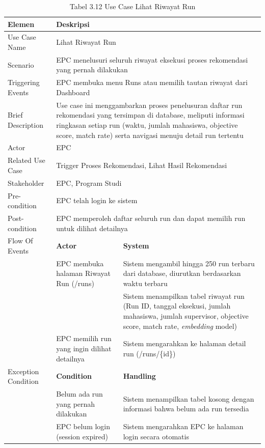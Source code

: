 \begin{longtable}{|p{3.5cm}|p{4.5cm}|p{5cm}|}
\caption{Tabel 3.12 Use Case Lihat Riwayat Run} \label{table:tab3.12} \\
\hline
\textbf{Elemen} & \multicolumn{2}{p{\ucdeskcol}|}{\textbf{Deskripsi}} \\
\hline
\endfirsthead
\endhead
\hline
\endfoot
Use Case Name & \multicolumn{2}{p{\ucdeskcol}|}{Lihat Riwayat Run} \\
\hline
Scenario & \multicolumn{2}{p{\ucdeskcol}|}{EPC menelusuri seluruh riwayat eksekusi proses rekomendasi yang pernah dilakukan} \\
\hline
Triggering Events & \multicolumn{2}{p{\ucdeskcol}|}{EPC membuka menu Runs atau memilih tautan riwayat dari Dashboard} \\
\hline
Brief Description & \multicolumn{2}{p{\ucdeskcol}|}{Use case ini menggambarkan proses penelusuran daftar run rekomendasi yang tersimpan di database, meliputi informasi ringkasan setiap run (waktu, jumlah mahasiswa, objective score, match rate) serta navigasi menuju detail run tertentu} \\
\hline
Actor & \multicolumn{2}{p{\ucdeskcol}|}{EPC} \\
\hline
Related Use Case & \multicolumn{2}{p{\ucdeskcol}|}{Trigger Proses Rekomendasi, Lihat Hasil Rekomendasi} \\
\hline
Stakeholder & \multicolumn{2}{p{\ucdeskcol}|}{EPC, Program Studi} \\
\hline
Pre-condition & \multicolumn{2}{p{\ucdeskcol}|}{EPC telah login ke sistem} \\
\hline
Post-condition & \multicolumn{2}{p{\ucdeskcol}|}{EPC memperoleh daftar seluruh run dan dapat memilih run untuk dilihat detailnya} \\
\hline
Flow Of Events & \textbf{Actor} & \textbf{System} \\
\hline
 & EPC membuka halaman Riwayat Run (/runs) & Sistem mengambil hingga 250 run terbaru dari database, diurutkan berdasarkan waktu terbaru \\
\hline
 & & Sistem menampilkan tabel riwayat run (Run ID, tanggal eksekusi, jumlah mahasiswa, jumlah supervisor, objective score, match rate, \textit{embedding} model) \\
\hline
 & EPC memilih run yang ingin dilihat detailnya & Sistem mengarahkan ke halaman detail run (/runs/\{id\}) \\
\hline
Exception Condition & \textbf{Condition} & \textbf{Handling} \\
\hline
 & Belum ada run yang pernah dilakukan & Sistem menampilkan tabel kosong dengan informasi bahwa belum ada run tersedia \\
\hline
 & EPC belum login (session expired) & Sistem mengarahkan EPC ke halaman login secara otomatis \\
\hline
\end{longtable}

